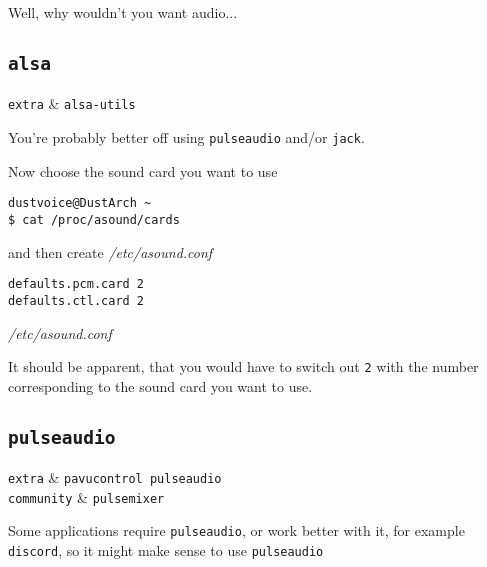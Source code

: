 \documentclass[10pt]{dustdoc}
\begin{document}
Well, why wouldn’t you want audio...

\subsection{\texttt{alsa}}
\label{sec:alsa}

\begin{packagetable}
    \texttt{extra} & \texttt{alsa-utils} \\
\end{packagetable}

\begin{NOTE}
    You’re probably better off using \texttt{pulseaudio} and/or \texttt{jack}.
\end{NOTE}

Now choose the sound card you want to use

\begin{verbatim}
dustvoice@DustArch ~
$ cat /proc/asound/cards
\end{verbatim}

\noindent
and then create \textit{/etc/asound.conf}

\begin{mintedlisting}
    \begin{verbatim}
defaults.pcm.card 2
defaults.ctl.card 2
    \end{verbatim}

    \caption{\textit{/etc/asound.conf}}
\end{mintedlisting}

\begin{NOTE}
    It should be apparent, that you would have to switch out \texttt{2} with the number corresponding to the sound card you want to use.
\end{NOTE}

\subsection{\texttt{pulseaudio}}
\label{sec:pulseaudio}

\begin{packagetable}
    \texttt{extra} & \texttt{pavucontrol pulseaudio} \\
    \texttt{community} & \texttt{pulsemixer} \\
\end{packagetable}

Some applications require \texttt{pulseaudio}, or work better with it, for example \texttt{discord}, so it might make sense to use \texttt{pulseaudio}
\end{document}
